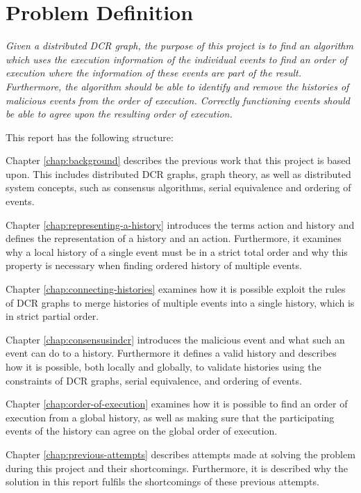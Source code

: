 \section{Problem Definition}
	\textit{Given a distributed DCR graph, the purpose of this project is to find an algorithm which uses the execution information of the individual events to find an order of execution where the information of these events are part of the result. Furthermore, the algorithm should be able to identify and remove the histories of malicious events from the order of execution. Correctly functioning events should be able to agree upon the resulting order of execution.}
	
	\vspace{0.4cm}
	
	\newpar
	This report has the following structure:
	
	\newpar
	Chapter \ref{chap:background} describes the previous work that this project is based upon. This includes distributed DCR graphs, graph theory, as well as distributed system concepts, such as consensus algorithms, serial equivalence and ordering of events.
		
	\newpar
	Chapter \ref{chap:representing-a-history} introduces the terms action and history and defines the representation of a history and an action.
	Furthermore, it examines why a local history of a single event must be in a strict total order and why this property is necessary when finding ordered history of multiple events. 
		
	\newpar
	Chapter \ref{chap:connecting-histories} examines how it is possible exploit the rules of DCR graphs to merge histories of multiple events into a single history, which is in strict partial order.
	
	\newpar
	Chapter \ref{chap:consensusindcr} introduces the malicious event and what such an event can do to a history. Furthermore it defines a valid history and describes how it is possible, both locally and globally, to validate histories using the constraints of DCR graphs, serial equivalence, and ordering of events.
	
    \newpar
    Chapter \ref{chap:order-of-execution} examines how it is possible to find an order of execution from a global history, as well as making sure that the participating events of the history can agree on the global order of execution.
    
	\newpar
	Chapter \ref{chap:previous-attempts} describes attempts made at solving the problem during this project and their shortcomings. Furthermore, it is described why the solution in this report fulfils the shortcomings of these previous attempts. 
		
	